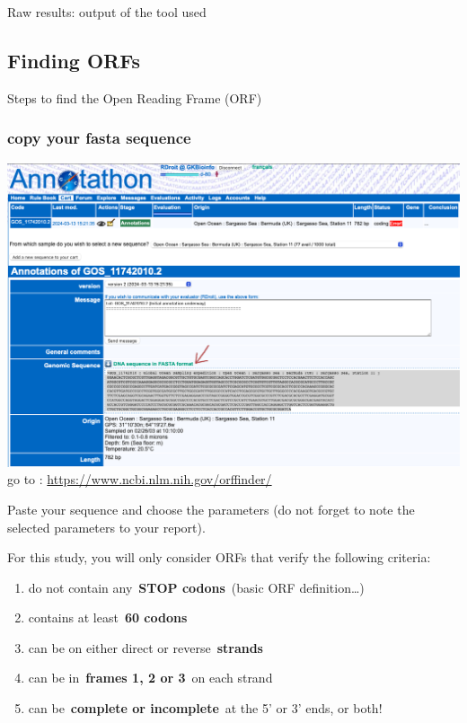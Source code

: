 \documentclass[
]{book}
\providecommand{\tightlist}{%
  \setlength{\itemsep}{0pt}\setlength{\parskip}{0pt}}
\begin{document}
Raw results:
output of the tool used

\hypertarget{finding-orfs}{%
\subsection{Finding ORFs}\label{finding-orfs}}

Steps to find the Open Reading Frame (ORF)

\hypertarget{copy-your-fasta-sequence}{%
\subsubsection{copy your fasta sequence}\label{copy-your-fasta-sequence}}

\includegraphics{figures/Annotathon/Annot_copy_sequence.png}
go to : \url{https://www.ncbi.nlm.nih.gov/orffinder/}

Paste your sequence and choose the parameters (do not forget to note the selected parameters to your report).

For this study, you will only consider ORFs that verify the following criteria:

\begin{enumerate}
\def\labelenumi{\arabic{enumi}.}
\tightlist
\item
  do not contain any~\textbf{STOP codons}~(basic ORF definition\ldots)
\item
  contains at least~\textbf{60 codons}
\item
  can be on either direct or reverse~\textbf{strands}
\item
  can be in~\textbf{frames 1, 2 or 3}~on each strand
\item
  can be~\textbf{complete or incomplete}~at the 5' or 3' ends, or both!
\end{enumerate}
\end{document}
